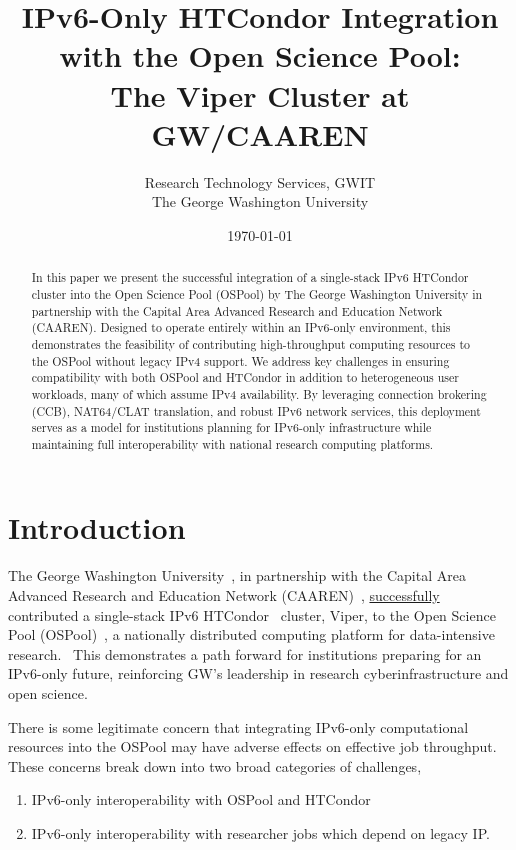 \documentclass[11pt]{article}
\title{IPv6-Only HTCondor Integration with the Open Science Pool: \\
The Viper Cluster at GW/CAAREN}
\author{Research Technology Services, GWIT\\
The George Washington University}
\date{\today}
\begin{document}
\maketitle

\begin{abstract}
In this paper we present the successful integration of a single-stack IPv6 HTCondor cluster into the Open Science Pool (OSPool) by The George Washington University in partnership with the Capital Area Advanced Research and Education Network (CAAREN). 
Designed to operate entirely within an IPv6-only environment, this demonstrates the feasibility of contributing 
high-throughput computing resources to the OSPool without legacy IPv4 support. We address key challenges in ensuring compatibility
with both OSPool and HTCondor in addition to heterogeneous user workloads, many of which assume IPv4 availability. By leveraging
connection brokering (CCB), NAT64/CLAT translation, and robust IPv6 network services, this deployment serves as a model for institutions
planning for IPv6-only infrastructure while maintaining full interoperability with national research computing platforms.


\end{abstract}
\tableofcontents

\section{Introduction}

The George Washington University~\cite{gwu}, in partnership with the Capital Area Advanced Research and Education Network (CAAREN)~\cite{caaren},  
\href{https://ce-dashboard.ospool.osg-htc.org/overview.html?host=gwu-viper-ce1&r=week}{successfully} 
contributed a single-stack IPv6 HTCondor~\cite{htcondor} cluster, Viper, to the Open Science Pool (OSPool)~\cite{ospool}, a nationally distributed computing platform for data-intensive research.~\cite{pordes2007,sfiligoi2009,osgospool,osgfs} This demonstrates a path forward for institutions preparing for an IPv6-only future, reinforcing GW’s leadership in research cyberinfrastructure and open science.

There is some legitimate concern that integrating IPv6-only computational resources into the OSPool may have adverse effects on effective job throughput. These concerns break down into two broad categories of challenges, 
\begin{enumerate}[itemsep=1pt]
\item IPv6-only interoperability with OSPool and HTCondor 
\item IPv6-only interoperability with researcher jobs which depend on legacy IP. 
\end{enumerate}
\end{document}
